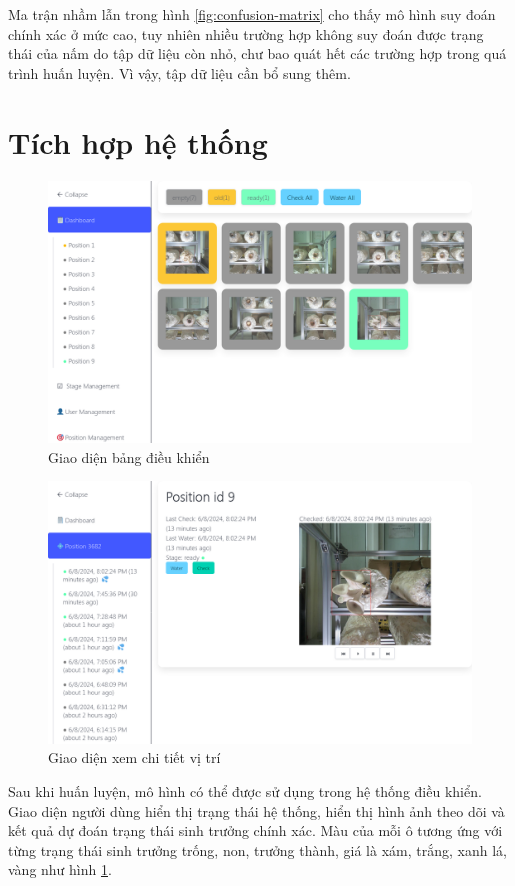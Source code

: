 Ma trận nhầm lẫn trong hình \ref{fig:confusion-matrix} cho thấy mô hình suy đoán chính xác ở mức cao, tuy nhiên nhiều trường hợp không suy đoán được trạng thái của nấm do tập dữ liệu còn nhỏ, chư bao quát hết các trường hợp trong quá trình huấn luyện. Vì vậy, tập dữ liệu cần bổ sung thêm.

\section{Tích hợp hệ thống}

\begin{figure}[h]
	\centering
	\includegraphics[width=0.8\linewidth]{images/ui-dashboard}
	\caption{Giao diện bảng điều khiển}
	\label{fig:ui-dashboard}
\end{figure}

\begin{figure}[H]
	\centering
	\includegraphics[width=0.8\linewidth]{images/ui-detail}
	\caption{Giao diện xem chi tiết vị trí}
	\label{fig:ui-detail}
\end{figure}

Sau khi huấn luyện, mô hình có thể được sử dụng trong hệ thống điều khiển. Giao diện người dùng hiển thị trạng thái hệ thống, hiển thị hình ảnh theo dõi và kết quả dự đoán trạng thái sinh trưởng chính xác. Màu của mỗi ô tương ứng với từng trạng thái sinh trưởng trống, non, trưởng thành, giá là xám, trắng, xanh lá, vàng như hình \ref{fig:ui-dashboard}.

